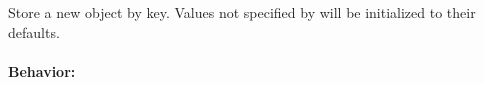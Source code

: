 Store a new object by key.  Values not specified by  will be
initialized to their defaults.

\paragraph{Behavior:}
\begin{itemize}[noitemsep]

\end{itemize}
